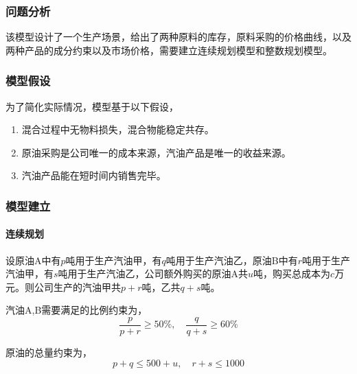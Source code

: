 
\subsubsection{问题分析}

该模型设计了一个生产场景，给出了两种原料的库存，原料采购的价格曲线，以及两种产品的成分约束以及市场价格，需要建立连续规划模型和整数规划模型。

\subsubsection{模型假设}

为了简化实际情况，模型基于以下假设，
\begin{enumerate}
    \item 混合过程中无物料损失，混合物能稳定共存。
    \item 原油采购是公司唯一的成本来源，汽油产品是唯一的收益来源。
    \item 汽油产品能在短时间内销售完毕。
\end{enumerate}

\subsubsection{模型建立}

\paragraph{连续规划} 设原油A中有$p$吨用于生产汽油甲，有$q$吨用于生产汽油乙，原油B中有$r$吨用于生产汽油甲，有$s$吨用于生产汽油乙，公司额外购买的原油A共$u$吨，购买总成本为$c$万元。则公司生产的汽油甲共$p+r$吨，乙共$q+s$吨。

汽油A,B需要满足的比例约束为，
\begin{equation}\label{eq:ex9_cons_prop}
    \frac{p}{p+r} \ge 50\%, \quad \frac{q}{q+s} \ge 60\%
\end{equation}

原油的总量约束为，
\begin{equation}\label{eq:ex9_cons_total}
    p+q \le 500 + u, \quad r+s \le 1000
\end{equation}

